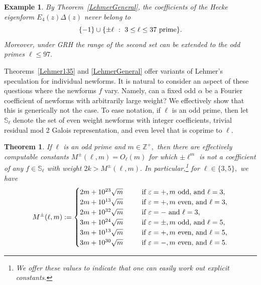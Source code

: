 \documentclass[12pt]{amsart}
\newtheorem{thm}{Theorem}[section]
\newtheorem*{example}{Example}
\newcommand{\Z}{\mathbb{Z}}
\newcommand{\?}{\color{red}?}
\numberwithin{equation}{section}
\begin{document}
\begin{example} By Theorem~\ref{LehmerGeneral},  the coefficients of the Hecke eigenform $E_4(z)\Delta(z)$ 
never belong to
$$\{-1\} \cup
\{\pm \ell \ : \  3\leq \ell \leq 37\ {\text {\rm prime}}\}.
$$
Moreover, under GRH the range of the second set can be extended to the odd primes $\ell \leq 97.$
\end{example}

Theorems~\ref{Lehmer135} and \ref{LehmerGeneral} offer variants of Lehmer's speculation for individual newforms.
It is natural to consider an aspect of these questions where the newforms $f$ vary. 
Namely, can a fixed odd $\alpha$ be a Fourier coefficient of
newforms with arbitrarily large weight? We effectively show that this is generically not the case. To ease notation, if $\ell$ is an odd prime, then let
$\mathbb{S}_{\ell}$ denote the set of even weight newforms with integer coefficients,
trivial residual mod 2 Galois representation, and even level that is coprime to $\ell$. 


\begin{thm}\label{Power}
If $\ell$ is an odd prime and $m\in \Z^{+},$ then there are effectively computable constants
$M^{\pm}(\ell,m)=O_{\ell}(m)$ for which
$\pm \ell^m$ is not a  coefficient of any
$f\in \mathbb{S}_{\ell}$ with weight $2k>M^{\pm}(\ell,m).$
In particular,\footnote{We offer these values to indicate that one can easily work out explicit constants.} 
for $\ell \in \{3, 5\},$ we have
$$
M^{\pm}(\ell,m):= \begin{cases}
2m+10^{23}\sqrt{m} \ \ \ \ \ &{\text {\rm if $\varepsilon=+, m$ odd, and $\ell=3$}},\\
2m+10^{13}\sqrt{m} \ \ \ \ \ &{\text {\rm if $\varepsilon=+, m$ even, and $\ell=3$}},\\
2m+10^{32}\sqrt{m} \ \ \ \ \ &{\text {\rm if $\varepsilon=-$ and $\ell=3$}},\\
3m+10^{24}\sqrt{m} \ \ \ \ \ &{\text {\rm if $\varepsilon=\pm, m$ odd, and $\ell=5$}},\\
3m+10^{13}\sqrt{m} \ \ \ \ \ &{\text {\rm if $\varepsilon=+, m$ even, and $\ell=5$}},\\
3m+10^{30}\sqrt{m} \ \ \ \ \ &{\text {\rm if $\varepsilon=-, m$ even, and $\ell=5$}}.\\
\end{cases}
$$                                  
\end{thm}
\end{document}
